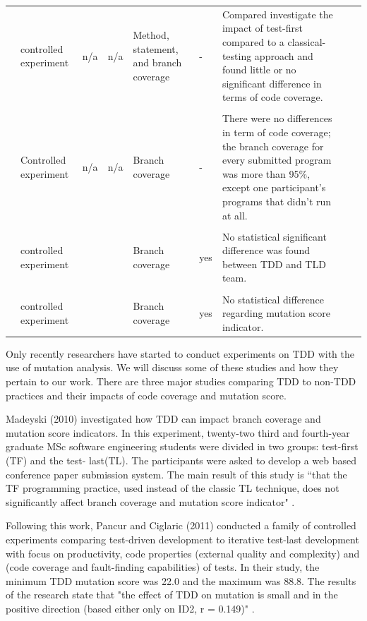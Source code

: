 \documentclass[conference]{IEEEtran}
\begin{document}
\begin{table}[htbp]
\begin{tabular}{p{0.5in} p{0.5in} p{0.25in} p{0.25in} p{0.75in} p{0.5in} p{3in} p{1in} p{1in}}
\cite{flohr2006lessons} & controlled experiment & n/a & n/a & Method, statement, and branch coverage & - & Compared investigate the impact of test-first compared to a classical-testing approach and found little or no significant difference in terms of code coverage.  \\ \\
\cite{geras2004prototype} & Controlled experiment  & n/a & n/a & Branch coverage & - & There were no differences in term of code coverage; the branch coverage for every submitted program was more than 95\%, except one participant’s programs that didn’t run at all. \\ \\
\cite{madeyski2010impact} & controlled experiment &  &  & Branch coverage & yes & No statistical significant difference was found between TDD and TLD team.  \\ \\
\cite{panvcur2011impact} & controlled experiment &  &  & Branch coverage & yes & No statistical difference regarding mutation score indicator.  \\ \hline
\end{tabular}
\end{table}

Only recently researchers have started to conduct experiments on TDD with the use of  mutation analysis. We will discuss some of these studies and how they pertain to our work. There are three major studies comparing TDD to non-TDD practices and their impacts of code coverage and mutation score. 

Madeyski \cite{madeyski2010impact} (2010) investigated how TDD can impact branch coverage and mutation score indicators. In this experiment, twenty-two third and fourth-year graduate MSc software engineering students were divided in two groups: test-first (TF) and the test- last(TL). The participants were asked to develop a web based conference paper submission system. The main result of this study is ``that the TF programming practice, used instead of the
classic TL technique, does not significantly affect branch coverage and mutation score indicator" \cite{madeyski2010impact}.

Following this work, Pancur and Ciglaric \cite{panvcur2011impact} (2011) conducted a family of controlled experiments comparing test-driven development to iterative test-last development with focus on productivity, code properties (external quality and complexity) and (code coverage and fault-finding capabilities) of tests. In their study, the minimum TDD mutation score was 22.0 and the maximum was 88.8. %
The results of the research state that "the effect of TDD on mutation is small and in the positive direction (based either only on ID2, r = 0.149)" \cite{panvcur2011impact}. %
\end{document}
